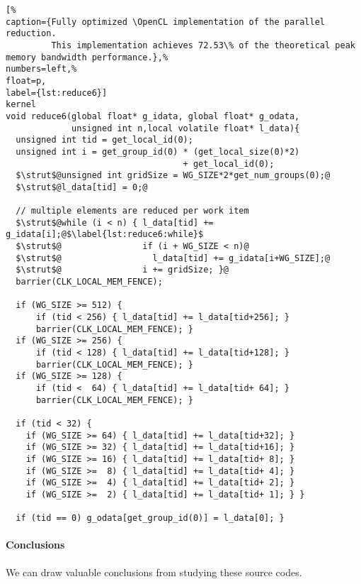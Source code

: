 \begin{lstlisting}[%                                                             
caption={Fully optimized \OpenCL implementation of the parallel reduction.
         This implementation achieves 72.53\% of the theoretical peak memory bandwidth performance.},%
numbers=left,%
float=p,
label={lst:reduce6}]
kernel
void reduce6(global float* g_idata, global float* g_odata,
             unsigned int n,local volatile float* l_data){
  unsigned int tid = get_local_id(0);
  unsigned int i = get_group_id(0) * (get_local_size(0)*2)
                                   + get_local_id(0);
  $\strut$@unsigned int gridSize = WG_SIZE*2*get_num_groups(0);@
  $\strut$@l_data[tid] = 0;@

  // multiple elements are reduced per work item
  $\strut$@while (i < n) { l_data[tid] += g_idata[i];@$\label{lst:reduce6:while}$
  $\strut$@                if (i + WG_SIZE < n)@
  $\strut$@                  l_data[tid] += g_idata[i+WG_SIZE];@
  $\strut$@                i += gridSize; }@
  barrier(CLK_LOCAL_MEM_FENCE);

  if (WG_SIZE >= 512) {
      if (tid < 256) { l_data[tid] += l_data[tid+256]; }
      barrier(CLK_LOCAL_MEM_FENCE); }
  if (WG_SIZE >= 256) {
      if (tid < 128) { l_data[tid] += l_data[tid+128]; }
      barrier(CLK_LOCAL_MEM_FENCE); }
  if (WG_SIZE >= 128) {
      if (tid <  64) { l_data[tid] += l_data[tid+ 64]; }
      barrier(CLK_LOCAL_MEM_FENCE); }
  
  if (tid < 32) {
    if (WG_SIZE >= 64) { l_data[tid] += l_data[tid+32]; }
    if (WG_SIZE >= 32) { l_data[tid] += l_data[tid+16]; }
    if (WG_SIZE >= 16) { l_data[tid] += l_data[tid+ 8]; }
    if (WG_SIZE >=  8) { l_data[tid] += l_data[tid+ 4]; }
    if (WG_SIZE >=  4) { l_data[tid] += l_data[tid+ 2]; }
    if (WG_SIZE >=  2) { l_data[tid] += l_data[tid+ 1]; } }
  
  if (tid == 0) g_odata[get_group_id(0)] = l_data[0]; }
\end{lstlisting}


\paragraph{Conclusions}
We can draw valuable conclusions from studying these \OpenCL source codes.

